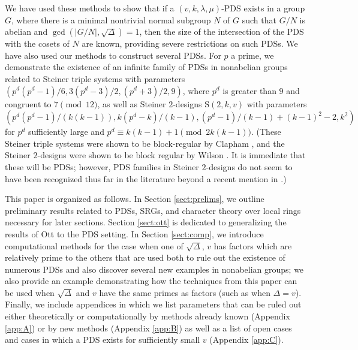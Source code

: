 \documentclass[12pt]{amsproc} %
\theoremstyle{definition}\newtheorem{defn}[thm]{Definition}
\theoremstyle{definition}\newtheorem{rem}[thm]{Remark}
\theoremstyle{definition}\newtheorem{ex}[thm]{Example}
\renewcommand{\S}{{\mathrm S}}
\begin{document}
We have used these methods to show that if a $(v, k, \lambda, \mu)$-PDS exists in a group $G$, where there is a minimal nontrivial normal subgroup $N$ of $G$ such that $G/N$ is abelian and $\gcd(|G/N|, \sqrt{\Delta}) = 1$, then the size of the intersection of the PDS with the cosets of $N$ are known, providing severe restrictions on such PDSs. We have also used our methods to construct several PDSs. For $p$ a prime, we demonstrate the existence of an infinite family of PDSs in nonabelian groups related to Steiner triple systems with parameters $(p^d(p^d-1)/6, 3(p^d-3)/2, (p^d + 3)/2, 9)$, where $p^d$ is greater than $9$ and congruent to $7 \pmod {12}$, as well as Steiner $2$-designs $\S(2, k, v)$ with parameters $(p^d(p^d - 1)/(k(k-1)), k(p^d-k)/(k-1), (p^d -1)/(k-1) + (k-1)^2 -2, k^2)$ for $p^d$ sufficiently large and $p^d \equiv k(k-1) + 1 \pmod{2k(k-1)}$. (These Steiner triple systems were shown to be block-regular by Clapham \cite{clapham}, and the Steiner $2$-designs were shown to be block regular by Wilson \cite{wilson}. It is immediate that these will be PDSs; however, PDS families in Steiner $2$-designs do not seem to have been recognized thus far in the literature beyond a recent mention in \cite{PonomarenkoRyabov_2025}.) 


This paper is organized as follows. In Section \ref{sect:prelims}, we outline preliminary results related to PDSs, SRGs, and character theory over local rings necessary for later sections. Section \ref{sect:ott} is dedicated to generalizing the results of Ott to the PDS setting. In Section \ref{sect:comp}, we introduce computational methods for the case when one of $\sqrt{\Delta}$, $v$ has factors which are relatively prime to the others that are used both to rule out the existence of numerous PDSs and also discover several new examples in nonabelian groups; we also provide an example demonstrating how the techniques from this paper can be used when $\sqrt{\Delta}$ and $v$ have the same primes as factors (such as when $\Delta = v$). Finally, we include appendices in which we list parameters that can be ruled out either theoretically or computationally by methods already known (Appendix \ref{app:A}) or by new methods (Appendix \ref{app:B}) as well as a list of open cases and cases in which a PDS exists for sufficiently small $v$ (Appendix \ref{app:C}).
\end{document}
